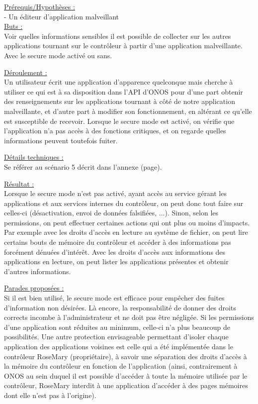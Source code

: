 \underline{Prérequis/Hypothèses :}\\
- Un éditeur d’application malveillant\\


\underline{Buts :}\\
Voir quelles informations sensibles il est possible de collecter sur les autres applications tournant sur le contrôleur à partir d’une application malveillante. Avec le secure mode activé ou sans.

\underline{Déroulement :}\\
Un utilisateur écrit une application d’apparence quelconque mais cherche à utiliser ce qui est à sa disposition dans l’API d’ONOS pour d’une part obtenir des renseignements sur les applications tournant à côté de notre application malveillante, et d’autre part à modifier son fonctionnement, en altérant ce qu’elle est susceptible de recevoir. Lorsque le secure mode est activé, on vérifie que l’application n’a pas accès à des fonctions critiques, et on regarde quelles informations peuvent toutefois fuiter.

\underline{Détails techniques :}\\
Se référer au scénario 5 décrit dans l'annexe (page).

\underline{Résultat :}\\
Lorsque le secure mode n'est pas activé, ayant accès au service gérant les applications et aux services internes du contrôleur, on peut donc tout faire sur celles-ci (désactivation, envoi de données falsifiées, ...). Sinon, selon les permissions, on peut effectuer certaines actions qui ont plus ou moins d'impacts. Par exemple avec les droits d'accès en lecture au système de fichier, on peut lire certains bouts de mémoire du contrôleur et accéder à des informations pas forcément dénuées d'intérêt. Avec les droits d'accès aux informations des applications en lecture, on peut lister les applications présentes et obtenir d'autres informations.

\underline{Parades proposées :}\\
Si il est bien utilisé, le secure mode est efficace pour empêcher des fuites d'information non désirées. Là encore, la responsabilité de donner des droits corrects incombe à l'administrateur et ne doit pas être négligée. Si les permissions d'une application sont réduites au minimum, celle-ci n'a plus beaucoup de possibilités. Une autre protection envisageable permettant d'isoler chaque application des applications voisines est celle qui a été implémentée dans le contrôleur RoseMary (propriétaire), à savoir une séparation des droits d'accès à la mémoire du contrôleur en fonction de l'application (ainsi, contrairement à ONOS au sein duquel il est possible d'accéder à toute la mémoire utilisée par le contrôleur, RoseMary interdit à une application d'accéder à des pages mémoires dont elle n'est pas à l'origine).

